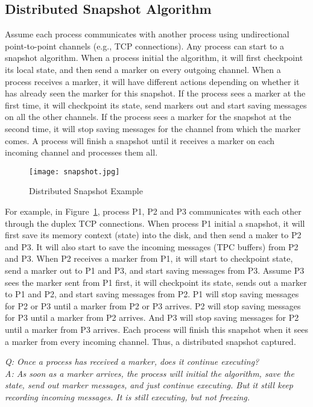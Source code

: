\documentclass[twoside]{article}
\begin{document}
\subsection{Distributed Snapshot Algorithm}

Assume each process communicates with another process using undirectional point-to-point channels (e.g., TCP connections). Any process can start to a snapshot algorithm. When a process initial the algorithm, it will first checkpoint its local state, and then send a marker on every outgoing channel. When a process receives a marker, it will have different actions depending on whether it has already seen the marker for this snapshot. If the process sees a marker at the first time, it will checkpoint its state, send markers out and start saving messages on all the other channels. If the process sees a marker for the snapshot at the second time, it will stop saving messages for the channel from which the marker comes. A process will finish a snapshot until it receives a marker on each incoming channel and processes them all.

\begin{figure}[H]
    \centering
    \texttt{[image: snapshot.jpg]}
    \caption{Distributed Snapshot Example}
    \label{fig:dsa}
\end{figure}

For example, in Figure~\ref{fig:dsa}, process P1, P2 and P3 communicates with each other through the duplex TCP connections. When process P1 initial a snapshot, it will first save its memory context (state) into the disk, and then send a maker to P2 and P3. It will also start to save the incoming messages (TPC buffers) from P2 and P3. When P2 receives a marker from P1, it will start to checkpoint state, send a marker out to P1 and P3, and start saving messages from P3. Assume P3 sees the marker sent from P1 first, it will checkpoint its state, sends out a marker to P1 and P2, and start saving messages from P2. P1 will stop saving messages for P2 or P3 until a marker from P2 or P3 arrives. P2 will stop saving messages for P3 until a marker from P2 arrives. And P3 will stop saving messages for P2 until a marker from P3 arrives. Each process will finish this snapshot when it sees a marker from every incoming channel. Thus, a distributed snapshot captured.

\textit{Q: Once a process has received a marker, does it continue executing? \\
A: As soon as a marker arrives, the process will initial the algorithm, save the state, send out marker messages, and just continue executing. But it still keep recording incoming messages. It is still executing, but not freezing.\\}
\end{document}
